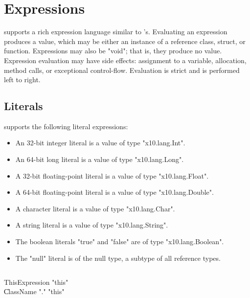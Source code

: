 \chapter{Expressions}\label{XtenExpressions}

\Xten{} supports a rich expression language similar to
\Java{}'s.
Evaluating an expression produces a value, which may be either
an instance of a reference class, struct, or function. 
Expressions may also be \xcd"void"; that is, they produce no
value.
Expression evaluation may have side effects: assignment to a
variable, allocation, method calls, or exceptional control-flow.
Evaluation is strict and is performed left to right.

\section{Literals}

\Xten{} supports the following literal expressions: 
\begin{itemize}
\item An 32-bit integer literal is a value of type \xcd"x10.lang.Int".
\item An 64-bit long literal is a value of type \xcd"x10.lang.Long".
\item A 32-bit floating-point literal is a value of type \xcd"x10.lang.Float".
\item A 64-bit floating-point literal is a value of type \xcd"x10.lang.Double".
\item A character literal is a value of type \xcd"x10.lang.Char".
\item A string literal is a value of type \xcd"x10.lang.String".
\item The boolean literals \xcd"true" and \xcd"false" are of type
\xcd"x10.lang.Boolean".
\item The \xcd"null" literal is of the null type,
a subtype of all reference types.
\end{itemize}

\section{}

\begin{grammar}
ThisExpression \: \xcd"this" \\
\| ClassName \xcd"." \xcd"this" \\
\end{grammar}

